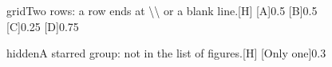 \documentclass[sectioning=nobreak]{myreport}
\begin{document}
\begin{demo}
\begin{mysub}{grid}{Two rows: a row ends at \textbackslash\textbackslash{}
or a blank line.}[H]
  [A]{0.5}
  [B]{0.5}\\
  [C]{0.25}
  [D]{0.75}
\end{mysub}
\end{demo}

\begin{demo}
\begin{mysub*}{hidden}{A starred group: not in the list of figures.}[H]
  [Only one]{0.3}
\end{mysub*}
\end{demo}
\end{document}
